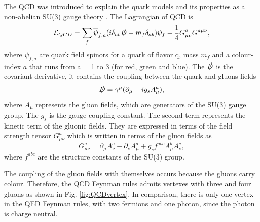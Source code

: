 The QCD was introduced to explain the quark models and its properties as a non-abelian SU(3) gauge theory \cite{Fritzsch:1973pi}. The Lagrangian of QCD is
\begin{equation}
    \mathcal{L}_{QCD} = \sum_f \overline{\psi}_{f,a}(i\delta_{ab}\slashed{D} - m_f\delta_{ab})\psi_{f} - \frac{1}{4}G^a_{\mu\nu}G^{a\mu\nu},
\end{equation}
where $\psi_{f, a}$ are quark field spinors for a quark of flavor q, mass $m_f$ and a colour-index $a$ that runs from a = 1 to 3 (for red, green and blue). The $\slashed{D}$ is the covariant derivative, it contains the coupling between the quark and gluons fields 
\begin{equation}
    \slashed{D} = \gamma^\mu(\partial_\mu - i g_s A^a_\mu),
\end{equation}
where $A_\mu$ represents the gluon fields, which are generators of the SU(3) gauge group. The $g_s$ is the gauge coupling constant. The second term represents the kinetic term of the gluonic fields. They are expressed in terms of the field strength tensor $G^a_{\mu\nu}$ which is written in terms of the gluon fields as
\begin{equation}
    G^a_{\mu\nu} = \partial_\mu A^a_\nu - \partial_\nu A^a_\mu + g_sf^{abc}A^b_\mu A^c_\nu,
\end{equation}
where $f^{abc}$ are the structure constants of the SU(3) group. 

The coupling of the gluon fields with themselves occurs because the gluons carry colour. Therefore, the QCD Feynman rules admits vertexes with three and four gluons as shown in Fig. \ref{fig:QCDvertex}. In comparison, there is only one vertex in the QED Feynman rules, with two fermions and one photon, since the photon is charge neutral.

